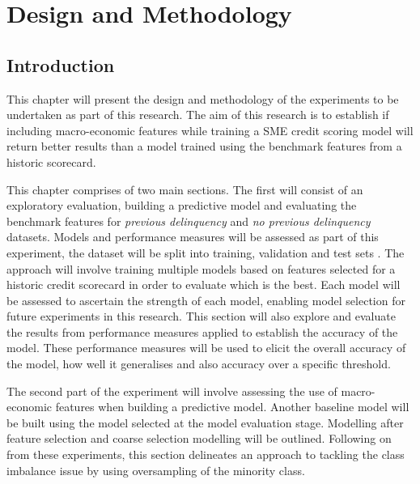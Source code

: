 
\chapter{Design and Methodology} %

\label{Chapter4} %


\section{Introduction}

This chapter will present the design and methodology of the experiments to be undertaken as part of this research. The aim of this research is to establish if including macro-economic features while training a SME credit scoring model will return better results than a model trained using the benchmark features from a historic scorecard. 

This chapter comprises of two main sections. The first will consist of an exploratory evaluation, building a predictive model and evaluating the benchmark features for \textit{previous delinquency} and \textit{no previous delinquency} datasets. Models and performance measures will be assessed as part of this experiment, the dataset will be split into training, validation and test sets . The approach will involve training multiple models based on features selected for a historic credit scorecard in order to evaluate which is the best. Each model will be assessed to  ascertain the strength of each model, enabling model selection for future experiments in this research. This section will also explore and evaluate the results from performance measures applied to establish the accuracy of the model. These performance measures will be used to elicit the overall accuracy of the model, how well it generalises and also accuracy over a specific threshold. 

The second part of the experiment will involve assessing the use of macro-economic features when building a predictive model. Another baseline model will be built using the model selected at the model evaluation stage. Modelling after feature selection and coarse selection  modelling will be outlined. Following on from these experiments, this section delineates an approach to tackling the class imbalance issue by using oversampling of the minority class.


